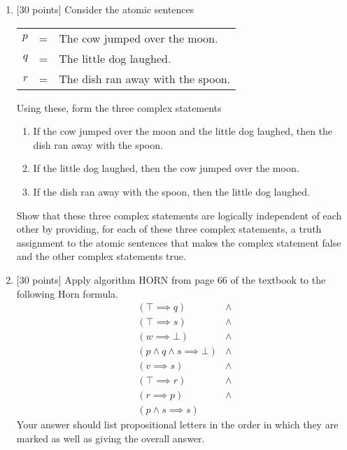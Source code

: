 \documentclass{article}
\begin{document}
\begin{enumerate}
\item {[30 points]} Consider the atomic sentences
  \begin{center}
    \begin{tabular}{rcl}
      $p$ &=& The cow jumped over the moon. \\
      $q$ &=& The little dog laughed. \\
      $r$ &=& The dish ran away with the spoon. \\
    \end{tabular}
  \end{center}
  Using these, form the three complex statements
  \begin{enumerate}
  \item If the cow jumped over the moon and the little dog laughed,
    then the dish ran away with the spoon.
  \item If the little dog laughed, then the cow jumped over the moon.
  \item If the dish ran away with the spoon, then the little dog
    laughed.
  \end{enumerate}
  Show that these three complex statements are logically independent
  of each other by providing, for each of these three complex
  statements, a truth assignment to the atomic sentences that makes
  the complex statement false and the other complex statements true.

\item {[30 points]} Apply algorithm HORN from page 66 of the textbook
  to the following Horn formula.
  \begin{displaymath}
    \begin{array}{ll}
      (\top \implies q) &\land \\
      (\top \implies s) &\land \\
      (w \implies \bot) &\land \\
      (p \land q \land s \implies \bot) &\land \\
      (v \implies s) &\land \\
      (\top \implies r) &\land \\
      (r \implies p) &\land \\
      (p \land s \implies s)
    \end{array}
  \end{displaymath}
  Your answer should list propositional letters in the order in which
  they are marked as well as giving the overall answer.

\end{enumerate}
\end{document}
